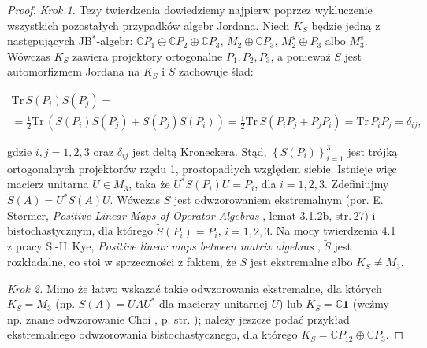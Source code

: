 {\begin{proof}
\emph{Krok 1.}
Tezy twierdzenia dowiedziemy najpierw poprzez wykluczenie wszystkich
pozostałych przypadków algebr Jordana.
Niech $K_{S}$ będzie jedną z następujących JB$^{*}$-algebr:
$\mathbb{C} P_{1} \oplus \mathbb{C} P_{2} \oplus \mathbb{C} P_{3}$,
$M_{2} \oplus \mathbb{C} P_{3}$,
$M_{2}^{s} \oplus P_{3}$ albo $M_{3}^{s}$.
Wówczas $K_{S}$ zawiera projektory ortogonalne $P_{1}, P_{2}, P_{3}$,
a ponieważ $S$ jest automorfizmem Jordana na $K_{S}$ i $S$ zachowuje ślad:
\begin{linenomath*}
 \begin{multline}
    \text{Tr} \, S(P_{i}) S(P_{j}) = \\
= \frac{1}{2} \text{Tr} \, \left( S(P_{i}) S(P_{j}) + S(P_{j}) S(P_{i}) \right)=
\frac{1}{2} \text{Tr} \, S(P_{i} P_{j} + P_{j} P_{i})=
\text{Tr} \, P_{i} P_{j} = \delta_{ij},
 \end{multline}
\end{linenomath*}
gdzie $i,j = 1,2,3$ oraz $\delta_{ij}$ jest deltą Kroneckera.
Stąd, $\left\{S(P_{i})\right\}_{i=1}^{3}$
jest trójką ortogonalnych projektorów rzędu 1, prostopadłych względem siebie.
Istnieje więc macierz unitarna $U \in M_{3}$, taka że
$U^{*} S(P_{i}) U = P_{i}$, dla $i = 1,2,3$.
Zdefiniujmy $\tilde{S}(A) = U^{*} S(A) U$.
Wówczas $\tilde{S}$ jest odwzorowaniem ekstremalnym
(por. E.\,St{\o}rmer, \emph{Positive Linear Maps of Operator Algebras}
\cite{Stormer2013}, lemat 3.1.2b, str.\,27)
i bistochastycznym, dla którego
$\tilde{S}(P_{i}) = P_{i}$, $i = 1,2,3$.
Na mocy twierdzenia 4.1 z pracy
S.-H.\,Kye, \emph{Positive linear maps between matrix algebras}
\cite{kye1995positive},
$\tilde{S}$ jest rozkładalne,
co stoi w sprzeczności z faktem, że $S$ jest ekstremalne albo $K_{S} \neq M_{3}$.

\emph{Krok 2.}
Mimo że łatwo wskazać takie odwzorowania ekstremalne, dla których
$K_{S}=M_{3}$ (np. $S(A) = U A U^{*}$ dla macierzy unitarnej $U$)
lub $K_{S}=\mathbb{C} \mathbf{1}$
(weźmy np. znane odwzorowanie Choi
\cite{choi1977extremal}, p. str. \pageref{eq:choi});
należy jeszcze podać przykład ekstremalnego odwzorowania bistochastycznego,
dla którego
$K_{S}= \mathbb{C} P_{12} \oplus \mathbb{C} P_{3}$.


\end{proof}}
